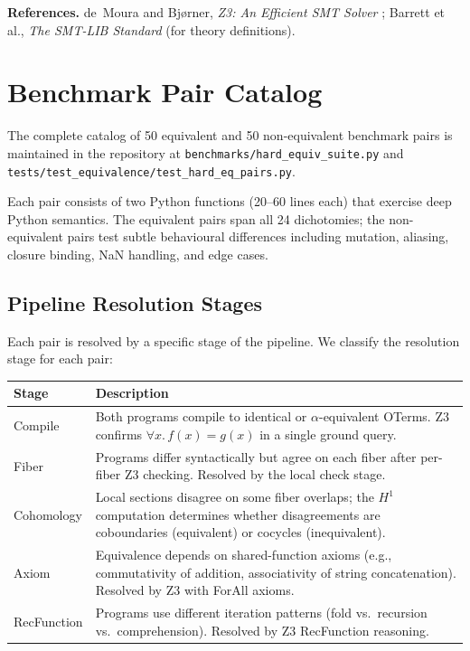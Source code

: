 \documentclass[11pt,a4paper]{report}
\theoremstyle{definition}
\theoremstyle{plain}
\newcommand{\Hone}{H^1}
\begin{document}
\noindent
\textbf{References.}
de~Moura and Bj{\o}rner, \emph{Z3: An Efficient SMT Solver}
\cite{moura2008};
Barrett et al., \emph{The SMT-LIB Standard} (for theory definitions).


\chapter{Benchmark Pair Catalog}
\label{app:pairs}

The complete catalog of 50 equivalent and 50 non-equivalent benchmark
pairs is maintained in the repository at
\texttt{benchmarks/hard\_equiv\_suite.py} and
\texttt{tests/test\_equivalence/test\_hard\_eq\_pairs.py}.

Each pair consists of two Python functions (20--60 lines each) that
exercise deep Python semantics.  The equivalent pairs span all 24
dichotomies; the non-equivalent pairs test subtle behavioural
differences including mutation, aliasing, closure binding, NaN
handling, and edge cases.

\section{Pipeline Resolution Stages}

Each pair is resolved by a specific stage of the pipeline.  We
classify the resolution stage for each pair:

\begin{center}
\begin{tabular}{l p{8cm}}
  \textbf{Stage} & \textbf{Description} \\
  \hline
  \textsf{Compile} &
    Both programs compile to identical or $\alpha$-equivalent OTerms.
    Z3 confirms $\forall x.\, f(x) = g(x)$ in a single ground query.
    \\
  \textsf{Fiber} &
    Programs differ syntactically but agree on each fiber after
    per-fiber Z3 checking.  Resolved by the local check stage. \\
  \textsf{Cohomology} &
    Local sections disagree on some fiber overlaps; the
    $\Hone$ computation determines whether disagreements are
    coboundaries (equivalent) or cocycles (inequivalent). \\
  \textsf{Axiom} &
    Equivalence depends on shared-function axioms (e.g., commutativity
    of addition, associativity of string concatenation).  Resolved
    by Z3 with ForAll axioms. \\
  \textsf{RecFunction} &
    Programs use different iteration patterns (fold vs.\ recursion
    vs.\ comprehension).  Resolved by Z3 RecFunction reasoning. \\
\end{tabular}
\end{center}
\end{document}
